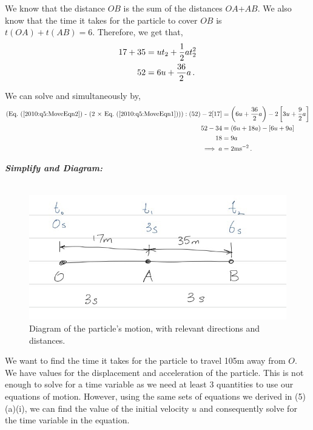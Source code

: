 \begin{subquestions}
\begin{subsubquestions}
We know that the distance $OB$ is the sum of the distances $OA$+$AB$. We also know that the time it takes for the particle to cover $OB$ is $t(OA)+t(AB)=6$. Therefore, we get that,
\begin{align}
	17+35 & = ut_2 + \frac{1}{2}at_2^2 \nonumber \\
	52 & = 6u + \frac{36}{2}a \,. \label{2010:q5:MoveEqn2}
\end{align}

We can solve  and  simultaneously by,
\begin{align}
	\text{(\req{2010:q5:MoveEqn2} - (2 $\times$ \req{2010:q5:MoveEqn1}))}:(52) - 2[17] & = \left(6u + \frac{36}{2}a\right) - 2\left[3u + \frac{9}{2}a\right] \nn \\
	                                                              52 - 34 & = \left(6u + 18a\right) - \left[6u + 9a\right] \nn \\
	                                                                   18 & = 9a \nn \\
	                                                                   \implies a & = 2\text{ms}^{-2} \,.
\end{align}


\subsubquestion

\textbf{\textit{Simplify and Diagram:}} \\ \\
\begin{figure}[H]
	\begin{center}
		\includegraphics[scale=0.5]{../2010/figures/2010q5}
		\caption{\label{2010:q5:Move3} Diagram of the particle's motion, with relevant directions and distances.}
	\end{center}
\end{figure}
We want to find the time it takes for the particle to travel 105m away from $O$. We have values for the displacement and acceleration of the particle. This is not enough to solve for a time variable as we need at least 3 quantities to use our equations of motion. However, using the same sets of equations we derived in (5)(a)(i), we can find the value of the initial velocity $u$ and consequently solve for the time variable in the equation.





\end{subsubquestions}
\end{subquestions}
